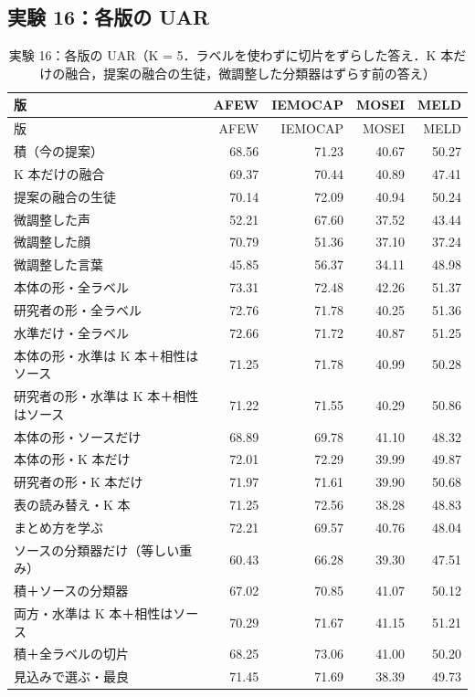 \scriptsize\setlength{\tabcolsep}{2.5pt}\setlength{\LTcapwidth}{\textwidth}
\subsection*{実験 16：各版の UAR}
\begin{longtable}{>{\raggedright}p{8.2cm}rrrr}
\caption{実験 16：各版の UAR（K = 5．ラベルを使わずに切片をずらした答え．K 本だけの融合，提案の融合の生徒，微調整した分類器はずらす前の答え）}\\
\toprule
版 & AFEW & IEMOCAP & MOSEI & MELD \\
\midrule
\endfirsthead
\toprule
版 & AFEW & IEMOCAP & MOSEI & MELD \\
\midrule
\endhead
\bottomrule
\endfoot

積（今の提案） & 68.56 & 71.23 & 40.67 & 50.27 \\
K 本だけの融合 & 69.37 & 70.44 & 40.89 & 47.41 \\
提案の融合の生徒 & 70.14 & 72.09 & 40.94 & 50.24 \\
微調整した声 & 52.21 & 67.60 & 37.52 & 43.44 \\
微調整した顔 & 70.79 & 51.36 & 37.10 & 37.24 \\
微調整した言葉 & 45.85 & 56.37 & 34.11 & 48.98 \\
本体の形・全ラベル & 73.31 & 72.48 & 42.26 & 51.37 \\
研究者の形・全ラベル & 72.76 & 71.78 & 40.25 & 51.36 \\
水準だけ・全ラベル & 72.66 & 71.72 & 40.87 & 51.25 \\
本体の形・水準は K 本＋相性はソース & 71.25 & 71.78 & 40.99 & 50.28 \\
研究者の形・水準は K 本＋相性はソース & 71.22 & 71.55 & 40.29 & 50.86 \\
本体の形・ソースだけ & 68.89 & 69.78 & 41.10 & 48.32 \\
本体の形・K 本だけ & 72.01 & 72.29 & 39.99 & 49.87 \\
研究者の形・K 本だけ & 71.97 & 71.61 & 39.90 & 50.68 \\
表の読み替え・K 本 & 71.25 & 72.56 & 38.28 & 48.83 \\
まとめ方を学ぶ & 72.21 & 69.57 & 40.76 & 48.04 \\
ソースの分類器だけ（等しい重み） & 60.43 & 66.28 & 39.30 & 47.51 \\
積＋ソースの分類器 & 67.02 & 70.85 & 41.07 & 50.12 \\
両方・水準は K 本＋相性はソース & 70.29 & 71.67 & 41.15 & 51.21 \\
積＋全ラベルの切片 & 68.25 & 73.06 & 41.00 & 50.20 \\
見込みで選ぶ・最良 & 71.45 & 71.69 & 38.39 & 49.73 \\
\end{longtable}
